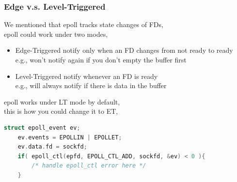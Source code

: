 \documentclass[aspectratio=43]{beamer}
\begin{document}
\begin{frame}[fragile]
  \frametitle{Edge v.s. Level-Triggered}
   We mentioned that epoll tracks state changes of FDs,\\
   epoll could work under two modes,\\
   \begin{itemize}
   \item Edge-Triggered {\scriptsize notify only when an FD changes from not ready to ready}\\
   {\footnotesize e.g., won't notify again if you don't empty the buffer first }
   \item Level-Triggered {\scriptsize notify whenever an FD is ready}\\
   {\footnotesize e.g., will always notify if there is data in the buffer }
   \end{itemize}
   
   epoll works under LT mode by default,\\this is how you could change it to ET,
   \begin{lstlisting}[language=C++,basicstyle=\ttfamily\footnotesize,commentstyle=\color{commgreen},keywordstyle=\color{blue},breaklines=true]
    struct epoll_event ev;
    ev.events = EPOLLIN | EPOLLET;
    ev.data.fd = sockfd;
    if( epoll_ctl(epfd, EPOLL_CTL_ADD, sockfd, &ev) < 0 ){
        /* handle epoll_ctl error here */
    }
   \end{lstlisting}
   
   
\end{frame}
\end{document}
